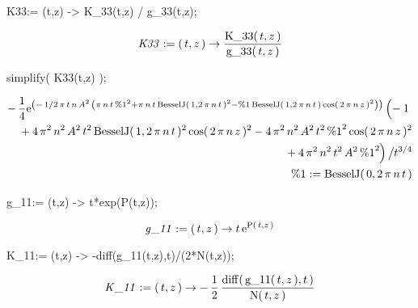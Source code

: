 \begin{mapleinput}
K33:= (t,z) -> K_33(t,z) / g_33(t,z);
\end{mapleinput}
\begin{maplelatex}
\[
{\it K33} := (\,{t}, {z}\,) \rightarrow {\displaystyle \frac {
{\rm K\_33}(\,{t}, {z}\,)}{{\rm g\_33}(\,{t}, {z}\,)}}
\]
\end{maplelatex}
                              \newpage
\begin{mapleinput}
simplify( K33(t,z) );
\end{mapleinput}
\begin{maplelatex}
\begin{eqnarray*}
\lefteqn{ - \,{\displaystyle \frac {1}{4}}{\rm e}^{ \left( \! \,
 - \,1/2\,{ \pi}\,{t}\,{n}\,{A}^{2}\, \left( \! \,{ \pi}\,{n}\,{t
}\,{\rm \%1}^{2} + { \pi}\,{n}\,{t}\,{\rm BesselJ}(\,1, 2\,{ \pi}
\,{n}\,{t}\,)^{2} - {\rm \%1}\,{\rm BesselJ}(\,1, 2\,{ \pi}\,{n}
\,{t}\,)\,{\rm cos}(\,2\,{ \pi}\,{n}\,{z}\,)^{2}\, \!  \right) \,
 \!  \right) } \left( {\vrule height0.44em width0em depth0.44em}
 \right. \! \!  - 1} \\
 & & \mbox{} + 4\,{ \pi}^{2}\,{n}^{2}\,{A}^{2}\,{t}^{2}\,{\rm 
BesselJ}(\,1, 2\,{ \pi}\,{n}\,{t}\,)^{2}\,{\rm cos}(\,2\,{ \pi}\,
{n}\,{z}\,)^{2} - 4\,{ \pi}^{2}\,{n}^{2}\,{A}^{2}\,{t}^{2}\,{\rm 
\%1}^{2}\,{\rm cos}(\,2\,{ \pi}\,{n}\,{z}\,)^{2} \\
 & & \mbox{} + 4\,{ \pi}^{2}\,{n}^{2}\,{t}^{2}\,{A}^{2}\,{\rm \%1
}^{2} \! \! \left. {\vrule height0.44em width0em depth0.44em}
 \right)  \left/ {\vrule height0.37em width0em depth0.37em}
 \right. \! \! {t}^{3/4} \\
 & & {\rm \%1} := {\rm BesselJ}(\,0, 2\,{ \pi}\,{n}\,{t}\,)
\end{eqnarray*}
\end{maplelatex}
\begin{mapleinput}
g_11:= (t,z) -> t*exp(P(t,z));
\end{mapleinput}
\begin{maplelatex}
\[
{\it g\_11} := (\,{t}, {z}\,) \rightarrow {t}\,{\rm e}^{{\rm P}(
\,{t}, {z}\,)}
\]
\end{maplelatex}
\begin{mapleinput}
K_11:= (t,z) -> -diff(g_11(t,z),t)/(2*N(t,z));
\end{mapleinput}
\begin{maplelatex}
\[
{\it K\_11} := (\,{t}, {z}\,) \rightarrow  - \,{\displaystyle 
\frac {1}{2}}\,{\displaystyle \frac {{\rm diff}(\,{\rm g\_11}(\,{
t}, {z}\,), {t}\,)}{{\rm N}(\,{t}, {z}\,)}}
\]
\end{maplelatex}
